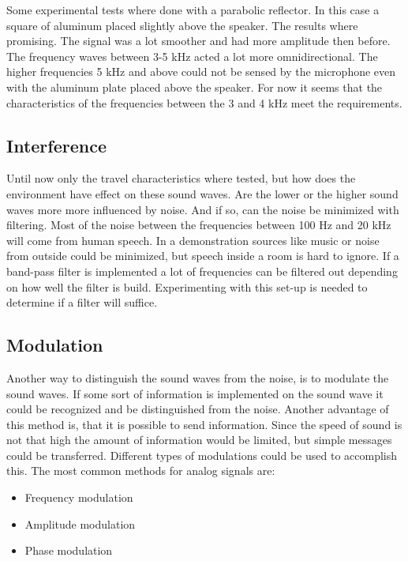 \documentclass[10pt,a4paper]{article}
\begin{document}
Some experimental tests where done with a parabolic reflector. In this case a square of aluminum placed slightly above the speaker. The results where promising. The signal was a lot smoother and had more amplitude then before. The frequency waves between 3-5 kHz acted a lot more omnidirectional. The higher frequencies 5 kHz and above could not be sensed by the microphone even with the aluminum plate placed above the speaker. For now it seems that the characteristics of the frequencies between the 3 and 4 kHz meet the requirements.


\subsection{Interference}

Until now only the travel characteristics where tested, but how does the environment have effect on these sound waves. Are the lower or the higher sound waves more more influenced by noise. And if so, can the noise be minimized with filtering. Most of the noise between the frequencies between 100 Hz and 20 kHz will come from human speech. In a demonstration sources like music or noise from outside could be minimized, but speech inside a room is hard to ignore. If a band-pass filter is implemented a lot of frequencies can be filtered out depending on how well the filter is build. Experimenting with this set-up is needed to determine if a filter will suffice.

\subsection{Modulation}

Another way to distinguish the sound waves from the noise, is to modulate the sound waves. If some sort of information is implemented on the sound wave it could be recognized and be distinguished from the noise. Another advantage of this method is, that it is possible to send information. Since the speed of sound is not that high the amount of information would be limited, but simple messages could be transferred. Different types of modulations could be used to accomplish this. The most common methods for analog signals are:  

\begin{itemize}
\item Frequency modulation
\item Amplitude modulation
\item Phase modulation
\end{itemize}
\end{document}
